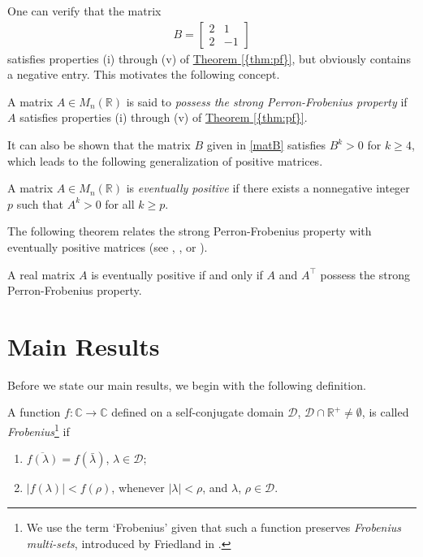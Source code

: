 \documentclass[10pt,twoside,leqno]{siamltex}
\begin{document}
One can verify that the matrix 
\begin{align} 
B = \begin{bmatrix} 2 & 1 \\ 2 & -1 \end{bmatrix} \label{matB}
\end{align} 
satisfies properties (i) through (v) of {\hyperref[{thm:pf}]{{\rm {Theorem} \ref*{{thm:pf}}}}}, but obviously contains a negative entry. This motivates the following concept.

\begin{definition} 
{\rm A matrix $A \in {M_{{n}}({{\mathbb{{R}}}})}$ is said to \textit{possess the strong Perron-Frobenius property} if $A$ satisfies properties (i) through (v) of {\hyperref[{thm:pf}]{{\rm {Theorem} \ref*{{thm:pf}}}}}.}
\end{definition}

It can also be shown that the matrix $B$ given in \eqref{matB} satisfies $B^k > 0$ for $k \geq 4$, which leads to the following generalization of positive matrices. 

\begin{definition}
{\rm A matrix $A \in {M_{{n}}({{\mathbb{{R}}}})}$ is \textit{eventually positive} if there exists a nonnegative integer $p$ such that $A^k > 0$ for all $k \geq p$.} 
\end{definition}

The following theorem relates the strong Perron-Frobenius property with eventually positive matrices (see \cite[Lemma 2.1]{h1981}, \cite[Theorem 1]{jt2004}, or \cite[Theorem 2.2]{n2006}).

\begin{theorem} \label{evpos_thm}
A real matrix $A$ is eventually positive if and only if $A$ and $A^\top$ possess the strong Perron-Frobenius property. 
\end{theorem}

\section{Main Results}

Before we state our main results, we begin with the following definition.

\begin{definition}
{\rm A function $f: {\mathbb{{C}}} \longrightarrow {\mathbb{{C}}}$ defined on a self-conjugate domain $\mathcal{D}$, $\mathcal{D} \cap {\mathbb{{R}}}^+ \neq \emptyset$, is called \textit{Frobenius}\footnote{We use the term `Frobenius' given that such a function preserves \textit{Frobenius multi-sets}, introduced by Friedland in \cite{f1978}.} if 
\begin{enumerate}[label=(\roman*)]
\item \label{item:selfconjugacy} $\overline{f(\lambda)} = f(\bar{\lambda})$, $\lambda \in \mathcal{D}$; 
\item \label{item:mod} $|f(\lambda)| < f(\rho)$, whenever $|\lambda|<\rho$, and $\lambda$, $\rho \in \mathcal{D}$.
\end{enumerate}}
\end{definition}
\end{document}
